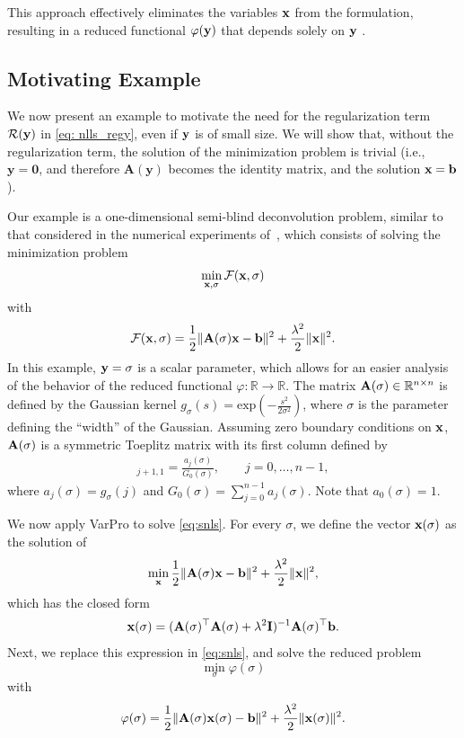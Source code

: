 \documentclass[onefignum,onetabnum]{siamart171218}
\newcommand{\bA}{{\bf A}}
\newcommand{\bI}{{\bf I}}
\newcommand{\bb}{{\bf b}}
\newcommand{\bx}{{\bf x}}
\newcommand{\by}{{\bf y}}
\newcommand{\calF}{\mathcal{F}}
\begin{document}
This approach effectively eliminates the variables $\bx$ from the formulation, resulting in a reduced functional $\varphi(\by)$ that depends solely on $\by$%
.

\subsection{Motivating Example}\label{sec: motivating example}
We now present an example to motivate the need for %
the regularization term $\mathcal{R}(\by)$ in \eqref{eq: nlls_regy}, even if $\by$ is of small size. We will show that, without the regularization term, the solution of the minimization problem is trivial (i.e., $\mathbf{y}=\boldsymbol{0}$, and therefore $\mathbf{A}(\mathbf{y})$ becomes the identity matrix, and the solution $\bx=\bb$). 

Our example is a one-dimensional semi-blind deconvolution problem, similar to that considered in the numerical experiments of~\cite{Espanol_2023}, which consists of solving the minimization problem
\begin{equation}\label{eq:snls}
\min_{\bx, \sigma}  \calF(\bx,\sigma) 
\end{equation}
with $$\calF(\bx,\sigma) = \frac{1}{2}\| \bA(\sigma)\bx - \bb \|^2 + \frac{\lambda^2}{2} \|\bx\|^2.$$
In this example, $\by = \sigma$ is a scalar parameter, which allows for an easier analysis of the behavior of the reduced functional $\varphi\colon \mathbb{R} \to \mathbb{R}$. The matrix $\bA(\sigma)\in \mathbb{R}^{n\times n}$ is defined by the Gaussian kernel
$g_\sigma(s) = \mbox{exp}\left(-\frac{s^2}{2\sigma^2}\right)$, where $\sigma$ is the parameter defining the ``width'' of the Gaussian. Assuming zero boundary conditions on $\bx$, $\bA(\sigma)$ is a symmetric Toeplitz matrix with its first column defined by
\begin{align}
   [\bA(\sigma)]_{j+1,1}= \frac{a_j(\sigma)}{G_0(\sigma)}  , \qquad j=0, \dots, n-1,\nonumber
\end{align}
where $a_j(\sigma)=g_\sigma(j)$ and  $G_0(\sigma) = \sum_{j=0}^{n-1} a_j(\sigma)$. Note that $a_0(\sigma)=1$.

We now apply VarPro to solve \eqref{eq:snls}. For every $\sigma$, we define the vector $\bx(\sigma)$ as the solution of
\[ \min_{\bx} \frac{1}{2}\|\bA(\sigma) \bx - \bb \|^2 + \frac{\lambda^2}{2}\| \bx\|^2,\]
which has the closed form
\[\bx(\sigma) = (\bA(\sigma)^\top \bA(\sigma) + \lambda^2 \bI)^{-1} \bA(\sigma)^\top \bb.\]
Next, we  replace this expression  in \eqref{eq:snls}, and solve the reduced problem
\begin{equation*}
\min_\sigma  \varphi(\sigma) 
\end{equation*}
with 
\begin{equation}\label{eq: Tik-problem}
\varphi(\sigma) = \frac{1}{2}\|\bA(\sigma) \bx(\sigma) - \bb\|^2 + \frac{\lambda^2}{2} \| \bx(\sigma)\|^2.
\end{equation}
\end{document}
